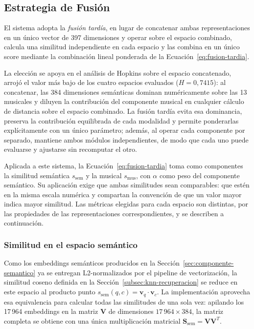 \subsection{Estrategia de Fusión}
\label{subsec:fusion}

El sistema adopta la \textit{fusión tardía}, en lugar de concatenar ambas representaciones en un único vector de 397 dimensiones y operar sobre el espacio combinado, calcula una similitud independiente en cada espacio y las combina en un único score mediante la combinación lineal ponderada de la Ecuación~\ref{eq:fusion-tardia}.

La elección se apoya en el análisis de Hopkins sobre el espacio concatenado, arrojó el valor más bajo de los cuatro espacios evaluados ($H = 0{,}7415$): al concatenar, las 384 dimensiones semánticas dominan numéricamente sobre las 13 musicales y diluyen la contribución del componente musical en cualquier cálculo de distancia sobre el espacio combinado. La fusión tardía evita esa dominancia, preserva la contribución equilibrada de cada modalidad y permite ponderarlas explícitamente con un único parámetro; además, al operar cada componente por separado, mantiene ambos módulos independientes, de modo que cada uno puede evaluarse y ajustarse sin recomputar el otro.

Aplicada a este sistema, la Ecuación~\ref{eq:fusion-tardia} toma como componentes la similitud semántica $s_{\text{sem}}$ y la musical $s_{\text{mus}}$, con $\alpha$ como peso del componente semántico. Su aplicación exige que ambas similitudes sean comparables: que estén en la misma escala numérica y compartan la convención de que un valor mayor indica mayor similitud. Las métricas elegidas para cada espacio son distintas, por las propiedades de las representaciones correspondientes, y se describen a continuación.

\subsubsection*{Similitud en el espacio semántico}

Como los embeddings semánticos producidos en la Sección~\ref{sec:componente-semantico} ya se entregan L2-normalizados por el pipeline de vectorización, la similitud coseno definida en la Sección~\ref{subsec:knn-recuperacion} se reduce en este espacio al producto punto $s_{\text{sem}}(q, c) = \mathbf{v}_q \cdot \mathbf{v}_c$. La implementación aprovecha esa equivalencia para calcular todas las similitudes de una sola vez: apilando los 17\,964 embeddings en la matriz $\mathbf{V}$ de dimensiones $17\,964 \times 384$, la matriz completa se obtiene con una única multiplicación matricial $\mathbf{S}_{\text{sem}} = \mathbf{V}\mathbf{V}^T$.

